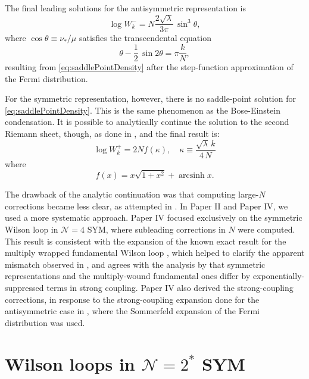 The final leading solutions for the antisymmetric representation is
\begin{equation}\label{solW-}
 \log W_{k}^-= N \frac{2\sqrt{\lambda }}{3\pi}\,\sin^3\theta, 
\end{equation}
where $\cos \theta\equiv \nu_*/\mu$ satisfies the transcendental equation
\begin{equation}\label{eqThetaAntisym}
 \theta -\frac{1}{2}\,\sin 2\theta =\pi \frac{k}{N},
\end{equation}
resulting from \eqref{eq:saddlePointDensity}
after the step-function approximation of the Fermi distribution.

For the symmetric representation, however, 
there is no saddle-point solution for \eqref{eq:saddlePointDensity}. 
This is the same phenomenon as the Bose-Einstein condensation.
It is possible to analytically continue the solution to the second Riemann sheet, though, 
as done in \cite{Hartnoll:2006is},
and the final result is:
\begin{equation}\label{solW+}
 \log W_{k}^+ = 2 N  f\left(\kappa\right),  
 \quad  \kappa \equiv \frac{\sqrt{\lambda }\,k}{4 \,N}
\end{equation}
where 
\begin{equation}\label{eqfSym}
 f(x) = x\sqrt{1+x^2}+\mathop{\mathrm{arcsinh}}x.
\end{equation}

The drawback of the analytic continuation was that computing large-$N$ corrections became less clear, as attempted in \cite{Faraggi:2014tna}.
In Paper II and Paper IV, we used a more systematic approach.
Paper IV focused exclusively on the symmetric Wilson loop in $\mathcal{N}=4$ SYM, 
where subleading corrections in $N$ were computed.
This result is consistent with the expansion of the known exact result for the multiply wrapped fundamental Wilson loop \cite{Kawamoto:2008gp},
which helped to clarify the apparent mismatch observed in \cite{Faraggi:2014tna},
and agrees with the analysis by \cite{Yamaguchi:2007ps} that symmetric representations and the multiply-wound fundamental ones 
differ by exponentially-suppressed terms in strong coupling.
Paper IV also derived the strong-coupling corrections, 
in response to the strong-coupling expansion done for the antisymmetric case in \cite{Horikoshi:2016hds},
where the Sommerfeld expansion of the Fermi distribution was used.




\section{Wilson loops in $\mathcal{N}=2^*$ SYM}

